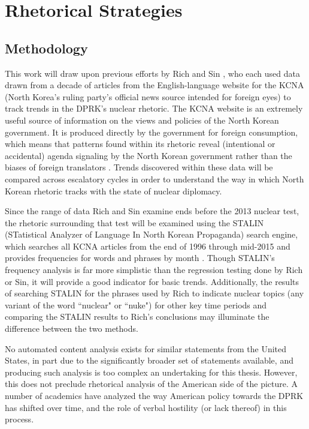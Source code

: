 \chapter{Rhetorical Strategies}

\section{Methodology}
This work will draw upon previous efforts by Rich \cite{rich12, rich14} and Sin \cite{sin}, who each used data drawn from a decade of articles from the English-language website for the KCNA (North Korea's ruling party's official news source intended for foreign eyes) to track trends in the DPRK's nuclear rhetoric. The KCNA website is an extremely useful source of information on the views and policies of the North Korean government. It is produced directly by the government for foreign consumption, which means that patterns found within its rhetoric reveal (intentional or accidental) agenda signaling by the North Korean government rather than the biases of foreign translators \cite{rich12}. Trends discovered within these data will be compared across escalatory cycles in order to understand the way in which North Korean rhetoric tracks with the state of nuclear diplomacy.

Since the range of data Rich and Sin examine ends before the 2013 nuclear test, the rhetoric surrounding that test will be examined using the STALIN (STatistical Analyzer of Language In North Korean Propaganda) search engine, which searches all KCNA articles from the end of 1996 through mid-2015 and provides frequencies for words and phrases by month \cite{stalin}. Though STALIN's frequency analysis is far more simplistic than the regression testing done by Rich or Sin, it will provide a good indicator for basic trends. Additionally, the results of searching STALIN for the phrases used by Rich to indicate nuclear topics (any variant of the word ``nuclear" or ``nuke") for other key time periods and comparing the STALIN results to Rich's conclusions may illuminate the difference between the two methods.

No automated content analysis exists for similar statements from the United States, in part due to the significantly broader set of statements available, and producing such analysis is too complex an undertaking for this thesis. However, this does not preclude rhetorical analysis of the American side of the picture. A number of academics have analyzed the way American policy towards the DPRK has shifted over time, and the role of verbal hostility (or lack thereof) in this process.

